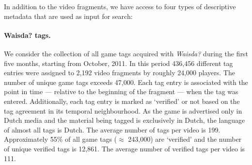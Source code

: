 

In addition to the video fragments, we have access to four types of descriptive metadata that are used as input for search:
\paragraph{\textbf{Waisda? tags.}} We consider the collection of all game tags acquired with \textit{Waisda?} during the first five months, starting from October, 2011. In this period 436,456 different tag entries were assigned to 2,192 video fragments by roughly 24,000 players. The number of unique game tags exceeds 47,000. Each tag entry is associated with the point in time --- relative to the beginning of the fragment --- when the tag was entered. Additionally, each tag entry is marked as `verified' or not based on the tag agreement in its temporal neighbourhood.
As the game is advertised only in Dutch media and the material being tagged is exclusively in Dutch, the language of almost all tags is Dutch. The average number of tags per video is 199. Approximately 55\% of all game tags ($\approx$ 243,000) are `verified' and the number of unique verified tags is 12,861. The average number of verified tags per video is 111.
